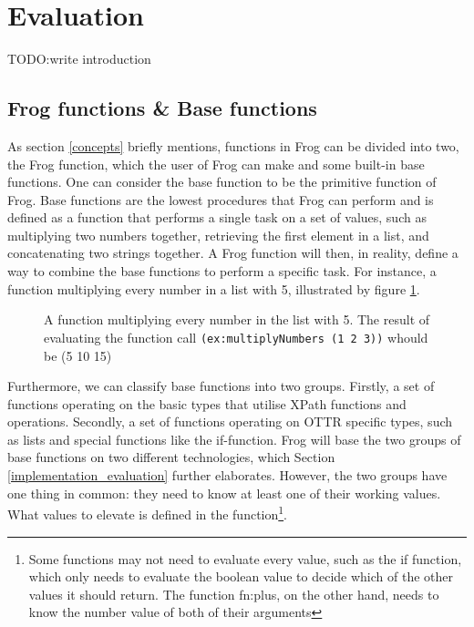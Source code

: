 \section{Evaluation}
TODO:write introduction

\subsection{Frog functions \& Base functions}
As section \ref{concepts} briefly mentions, functions in Frog can be divided into two, the Frog function, which the user of Frog can make and some built-in base functions. One can consider the base function to be the primitive function of Frog. Base functions are the lowest procedures that Frog can perform and is defined as a function that performs a single task on a set of values, such as multiplying two numbers together, retrieving the first element in a list, and concatenating two strings together. A Frog function will then, in reality, define a way to combine the base functions to perform a specific task. For instance, a function multiplying every number in a list with 5, illustrated by figure \ref{fig:list_multiplication}. 

\begin{figure}
    
    \caption{A function multiplying every number in the list with 5. The result of evaluating the function call \lstinline{(ex:multiplyNumbers (1 2 3))} whould be (5 10 15)}
    \label{fig:list_multiplication}
\end{figure}


\para
Furthermore, we can classify base functions into two groups. Firstly, a set of functions operating on the basic types that utilise XPath functions and operations. Secondly, a set of functions operating on OTTR specific types, such as lists and special functions like the if-function. Frog will base the two groups of base functions on two different technologies, which Section \ref{implementation_evaluation} further elaborates. However, the two groups have one thing in common: they need to know at least one of their working values. What values to elevate is defined in the function\footnote{Some functions may not need to evaluate every value, such as the if function, which only needs to evaluate the boolean value to decide which of the other values it should return. The function fn:plus, on the other hand, needs to know the number value of both of their arguments}. 


